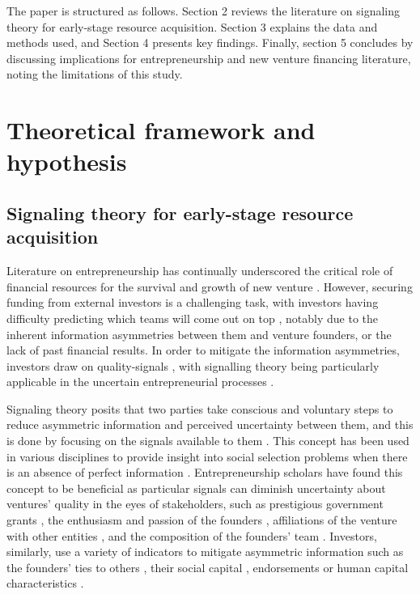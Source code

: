 \documentclass[12pt]{article}
\begin{document}
The paper is structured as follows. Section 2 reviews the literature on signaling theory for early-stage resource acquisition. Section 3 explains the data and methods used, and Section 4 presents key findings. Finally, section 5 concludes by discussing implications for entrepreneurship and new venture financing literature, noting the limitations of this study.

\section{Theoretical framework and hypothesis}

\subsection{Signaling theory for early-stage resource acquisition}

Literature on entrepreneurship has continually underscored the critical role of financial resources for the survival and growth of new venture \citep{cooper1994initial, drover2017review, klein2020start}. However, securing funding from external investors is a challenging task, with investors having difficulty predicting which teams will come out on top \citep{ghassemiautomated}, notably due to the inherent information asymmetries between them and venture founders, or the lack of past financial results. In order to mitigate the information asymmetries, investors draw on quality-signals \citep{ko2018signaling, subramanian2022backing}, with signalling theory being particularly applicable in the uncertain entrepreneurial processes \citep{spence1978job}.

Signaling theory posits that two parties take conscious and voluntary steps to reduce asymmetric information and perceived uncertainty between them, and this is done by focusing on the signals available to them \citep{spence1974market}. This concept has been used in various disciplines to provide insight into social selection problems when there is an absence of perfect information \citep{connelly2011signaling, colombo2021use}. Entrepreneurship scholars have found this concept to be beneficial as particular signals can diminish uncertainty about ventures' quality in the eyes of stakeholders, such as prestigious government grants \citep{islam2018signaling}, the enthusiasm and passion of the founders \citep{chen2009entrepreneur}, affiliations of the venture with other entities \citep{plummer2016better}, and the composition of the founders' team \citep{ko2018signaling}. Investors, similarly, use a variety of indicators to mitigate asymmetric information such as the founders' ties to others \citep{shane2002network}, their social capital \citep{shane2002organizational}, endorsements \citep{courtney2017resolving, janney2006moderating, plummer2016better, gasiorowski2022pay} or human capital characteristics \citep{beckman2007early}.
\end{document}
